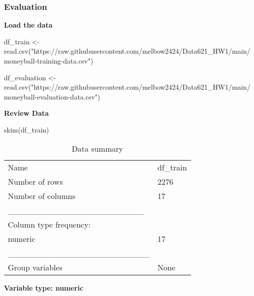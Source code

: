 \documentclass[
]{article}
\newenvironment{Shaded}{\begin{snugshade}}{\end{snugshade}}
\newcommand{\FunctionTok}[1]{\textcolor[rgb]{0.00,0.00,0.00}{#1}}
\newcommand{\NormalTok}[1]{#1}
\newcommand{\OtherTok}[1]{\textcolor[rgb]{0.56,0.35,0.01}{#1}}
\newcommand{\StringTok}[1]{\textcolor[rgb]{0.31,0.60,0.02}{#1}}
\begin{document}
\hypertarget{evaluation}{%
\subsubsection{Evaluation}\label{evaluation}}

\textbf{Load the data}

\begin{Shaded}
\begin{Highlighting}[]
\NormalTok{df\_train }\OtherTok{\textless{}{-}} \FunctionTok{read.csv}\NormalTok{(}\StringTok{"https://raw.githubusercontent.com/melbow2424/Data621\_HW1/main/moneyball{-}training{-}data.csv"}\NormalTok{)}

\NormalTok{df\_evaluation }\OtherTok{\textless{}{-}} \FunctionTok{read.csv}\NormalTok{(}\StringTok{"https://raw.githubusercontent.com/melbow2424/Data621\_HW1/main/moneyball{-}evaluation{-}data.csv"}\NormalTok{)}
\end{Highlighting}
\end{Shaded}

\textbf{Review Data}

\begin{Shaded}
\begin{Highlighting}[]
\FunctionTok{skim}\NormalTok{(df\_train)}
\end{Highlighting}
\end{Shaded}

\begin{longtable}[]{@{}ll@{}}
\caption{Data summary}\tabularnewline
\toprule()
\endhead
Name & df\_train \\
Number of rows & 2276 \\
Number of columns & 17 \\
\_\_\_\_\_\_\_\_\_\_\_\_\_\_\_\_\_\_\_\_\_\_\_ & \\
Column type frequency: & \\
numeric & 17 \\
\_\_\_\_\_\_\_\_\_\_\_\_\_\_\_\_\_\_\_\_\_\_\_\_ & \\
Group variables & None \\
\bottomrule()
\end{longtable}

\textbf{Variable type: numeric}
\end{document}
